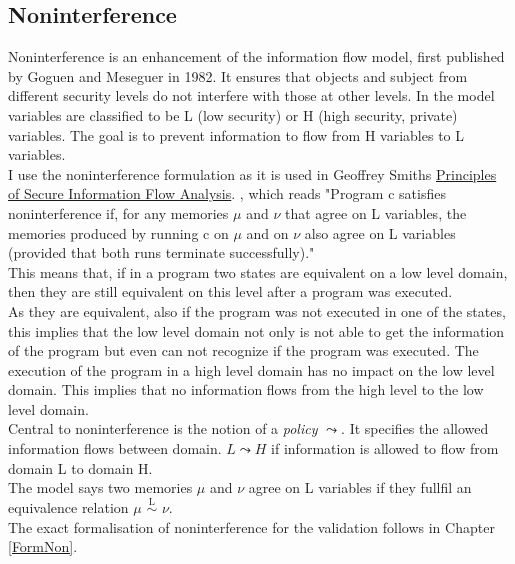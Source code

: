\subsection{Noninterference}
Noninterference is an enhancement of the information flow model, first published by Goguen and Meseguer in 1982. It ensures that objects and subject from different security levels do not interfere with those at other levels. In the model variables are classified to be L (low security) or H (high security, private) variables. The goal is to prevent information to flow from H variables to L variables. \\
I use the noninterference formulation as it is used in Geoffrey Smiths \href{http://users.cis.fiu.edu/~smithg/papers/sif06.pdf}{%
		Principles of Secure Information Flow Analysis}. \cite{InfFlow}, which reads "Program c satisfies noninterference if, for any memories $\mu$ and $\nu$ that agree on L variables, the memories produced by running c on $\mu$ and on $\nu$ also agree on L variables (provided that both runs terminate successfully)." \\
This means that, if in a program two states are equivalent on a low level domain, then they are still equivalent on this level after a program was executed.\\ As they are equivalent, also if the program was not executed in one of the states, this implies that the low level domain not only is not able to get the information of the program but even can not recognize if the program was executed. The execution of the program in a high level domain has no impact on the low level domain. This implies that no information flows from the high level to the low level domain. \\
Central to noninterference is the notion of a \textit{policy} $\leadsto$. It specifies the allowed information  flows between domain. $L \leadsto H$ if information is allowed to flow from domain L to domain H. \\
The model says two memories $\mu$ and $\nu$ agree on L variables if they fullfil an equivalence relation $\mu$ $\overset{\text{L}}{\sim}$ $\nu$. \\
The exact formalisation of noninterference for the validation follows in Chapter \ref{FormNon}.